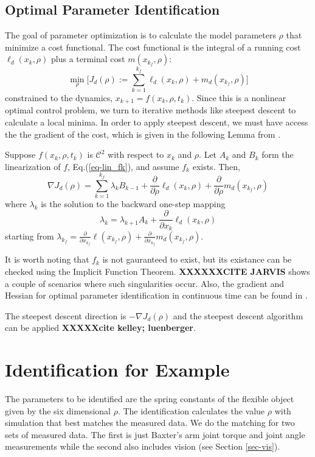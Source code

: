 \documentclass[runningheads,a4paper]{llncs}
\begin{document}
\subsection{Optimal Parameter Identification \label{sec-opt}}
The goal of parameter optimization is to calculate the model parameters $\rho$ that minimize a cost functional.  The cost functional is the integral of a running cost $\ell_d(x_k,\rho)$ plus a terminal cost $m(x_{k_f},\rho)$:
\[
\min_{\rho} \Big[J_d(\rho):=\sum_{k=1}^{k_f}\ell_d(x_k,\rho) + m_d(x_{k_f},\rho)\Big]
\]
constrained to the dynamics, $x_{k+1} = f(x_k,\rho,t_k)$. Since this is a nonlinear optimal control problem, we turn to iterative methods like steepest descent to calculate a local minima. In order to apply steepest descent, we must have access the the gradient of the cost, which is given in the following Lemma from \cite{caldwell_coleman_correll_iros}. 
\begin{lemma}
\label{lem-grad_a}
Suppose $f(x_k,\rho,t_k)$ is $\mathcal{C}^2$ with respect to $x_k$ and $\rho$.  Let $A_k$ and $B_k$ form the linearization of $f$, Eq.(\ref{eq-lin_fk}), and assume $f_k$ exists.  Then,
\begin{equation}
\nabla J_d(\rho) = \sum_{k = 1}^{k_f}\lambda_kB_{k-1} +\frac{\partial}{\partial \rho}\ell_d(x_k,\rho) + \frac{\partial}{\partial \rho}m_d(x_{k_f},\rho)
\label{eq-DJa}
\end{equation}
where $\lambda_k$ is the solution to the backward one-step mapping
\begin{equation}
\lambda_k = \lambda_{k+1}A_{k} + \frac{\partial}{\partial x_{k}}\ell_d(x_{k},\rho) 
\label{eq-lambda}
\end{equation}
starting from $\lambda_{k_f} = \frac{\partial}{\partial x_{k_f}}\ell(x_{k_f},\rho) + \frac{\partial}{\partial x_{k_f}}m_d(x_{k_f},\rho)$.  
\end{lemma}

It is worth noting that $f_k$ is not gauranteed to exist, but its existance can be checked using the Implicit Function Theorem. \textbf{XXXXXXCITE JARVIS} shows a couple of scenarios where such singularities occur.  Also, the gradient and Hessian for optimal parameter identification in continuous time can be found in \cite{miller_murphey}.

The steepest descent direction is $-\nabla J_d(\rho)$ and the steepest descent algorithm can be applied \textbf{XXXXXcite kelley; luenberger}.

\section{Identification for Example}
The parameters to be identified are the spring constants of the flexible object given by the six dimensional $\rho$.  The identification calculates the value $\rho$ with simulation that best matches the measured data. We do the matching for two sets of measured data.  The first is just Baxter's arm joint torque and joint angle measurements while the second also includes vision (see Section \ref{sec-vis}).  
\end{document}
